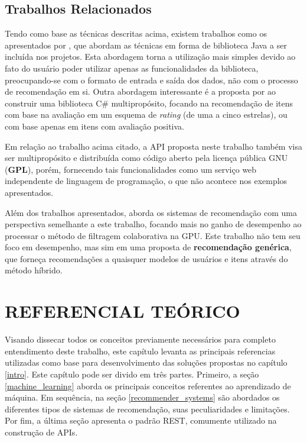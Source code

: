 \documentclass[12pt, openright, oneside, a4paper, brazil]{abntex2}
\begin{document}
\section{Trabalhos Relacionados} \label{related_work}

Tendo como base as técnicas descritas acima, existem trabalhos como os apresentados por , que abordam as técnicas em forma de biblioteca Java a ser incluída nos projetos. Esta abordagem torna a utilização mais simples devido ao fato do usuário poder utilizar apenas as funcionalidades da biblioteca, preocupando-se com o formato de entrada e saída dos dados, não com o processo de recomendação em si. Outra abordagem interessante é a proposta por  ao construir uma biblioteca C\# multipropósito, focando na recomendação de itens com base na avaliação em um esquema de \textit{rating} (de uma a cinco estrelas), ou com base apenas em itens com avaliação positiva.

Em relação ao trabalho acima citado, a API proposta neste trabalho também visa ser multipropósito e distribuída como código aberto pela licença pública GNU (\textbf{GPL}), porém, fornecendo tais funcionalidades como um serviço web independente de linguagem de programação, o que não acontece nos exemplos apresentados.

Além dos trabalhos apresentados,  aborda os sistemas de recomendação com uma perspectiva semelhante a este trabalho, focando mais no ganho de desempenho ao processar o método de filtragem colaborativa na GPU. Este trabalho não tem seu foco em desempenho, mas sim em uma proposta de \textbf{recomendação genérica}, que forneça recomendações a quaisquer modelos de usuários e itens através do método híbrido.

%
%

\cleardoublepage

\chapter{REFERENCIAL TEÓRICO}

Visando dissecar todos os conceitos previamente necessários para completo entendimento deste trabalho, este capítulo levanta as principais referencias utilizadas como base para desenvolvimento das soluções propostas no capítulo \ref{intro}. Este capítulo pode ser divido em três partes. Primeiro, a seção \ref{machine_learning} aborda os principais conceitos referentes ao aprendizado de máquina. Em sequência, na seção \ref{recommender_systems} são abordados os diferentes tipos de sistemas de recomendação, suas peculiaridades e limitações. Por fim, a última seção apresenta o padrão REST, comumente utilizado na construção de APIs.
\end{document}
